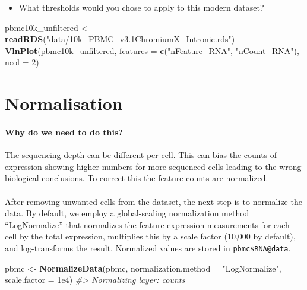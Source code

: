 \documentclass[
]{book}
\newenvironment{Shaded}{\begin{snugshade}}{\end{snugshade}}
\newcommand{\AttributeTok}[1]{\textcolor[rgb]{0.13,0.29,0.53}{#1}}
\newcommand{\CommentTok}[1]{\textcolor[rgb]{0.56,0.35,0.01}{\textit{#1}}}
\newcommand{\DecValTok}[1]{\textcolor[rgb]{0.00,0.00,0.81}{#1}}
\newcommand{\FloatTok}[1]{\textcolor[rgb]{0.00,0.00,0.81}{#1}}
\newcommand{\FunctionTok}[1]{\textcolor[rgb]{0.13,0.29,0.53}{\textbf{#1}}}
\newcommand{\NormalTok}[1]{#1}
\newcommand{\OtherTok}[1]{\textcolor[rgb]{0.56,0.35,0.01}{#1}}
\newcommand{\StringTok}[1]{\textcolor[rgb]{0.31,0.60,0.02}{#1}}
\providecommand{\tightlist}{%
  \setlength{\itemsep}{0pt}\setlength{\parskip}{0pt}}
\begin{document}
\begin{itemize}
\tightlist
\item
  What thresholds would you chose to apply to this modern dataset?
\end{itemize}

\begin{Shaded}
\begin{Highlighting}[]
\NormalTok{pbmc10k\_unfiltered }\OtherTok{\textless{}{-}} \FunctionTok{readRDS}\NormalTok{(}\StringTok{"data/10k\_PBMC\_v3.1ChromiumX\_Intronic.rds"}\NormalTok{)}
\FunctionTok{VlnPlot}\NormalTok{(pbmc10k\_unfiltered, }\AttributeTok{features =} \FunctionTok{c}\NormalTok{(}\StringTok{"nFeature\_RNA"}\NormalTok{, }\StringTok{"nCount\_RNA"}\NormalTok{), }\AttributeTok{ncol =} \DecValTok{2}\NormalTok{)}
\end{Highlighting}
\end{Shaded}

\chapter{Normalisation}\label{norm}

\subsubsection*{Why do we need to do this?}\label{why-do-we-need-to-do-this-1}

The sequencing depth can be different per cell. This can bias the counts of expression showing higher numbers for more sequenced cells leading to the wrong biological conclusions. To correct this the feature counts are normalized.

\subsubsection*{}\label{section-3}

After removing unwanted cells from the dataset, the next step is to normalize the data. By default, we employ a global-scaling normalization method ``LogNormalize'' that normalizes the feature expression measurements for each cell by the total expression, multiplies this by a scale factor (10,000 by default), and log-transforms the result. Normalized values are stored in \texttt{pbmc\$RNA@data}.

\begin{Shaded}
\begin{Highlighting}[]
\NormalTok{pbmc }\OtherTok{\textless{}{-}} \FunctionTok{NormalizeData}\NormalTok{(pbmc, }\AttributeTok{normalization.method =} \StringTok{"LogNormalize"}\NormalTok{, }\AttributeTok{scale.factor =} \FloatTok{1e4}\NormalTok{)}
\CommentTok{\#\textgreater{} Normalizing layer: counts}
\end{Highlighting}
\end{Shaded}
\end{document}
